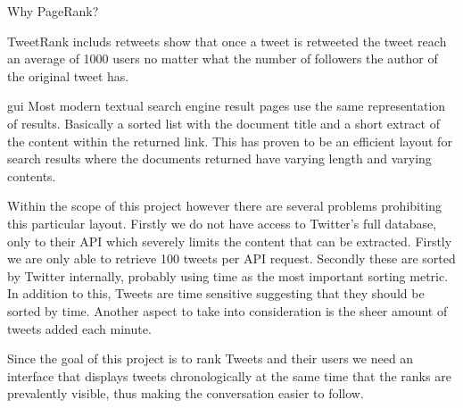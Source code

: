 Why PageRank?

TweetRank
includs retweets
\cite{Kwak2010} show that once a tweet is retweeted the tweet reach an average of 1000 users no matter what the number of followers the author of the original tweet has. 

gui
Most modern textual search engine result pages use the same representation of results. Basically a sorted list with the document title and a short extract of the content within the returned link. This has proven to be an efficient layout for search results where the documents returned have varying length and varying contents. 

Within the scope of this project however there are several problems prohibiting this particular layout. Firstly we do not have access to Twitter’s full database, only to their API which severely limits the content that can be extracted. Firstly we are only able to retrieve 100 tweets per API request. Secondly these are sorted by Twitter internally, probably using time as the most important sorting metric. In addition to this, Tweets are time sensitive suggesting that they should be sorted by time. Another aspect to take into consideration is the sheer amount of tweets added each minute.

Since the goal of this project is to rank Tweets and their users we need an interface that displays tweets chronologically at the same time that the ranks are prevalently visible, thus making the conversation easier to follow.